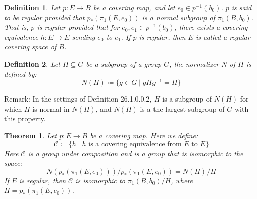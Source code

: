 \documentclass[11pt]{book}
\theoremstyle{break}
\theoremstyle{break}
\newtheorem{thm}{Theorem}[section]
\newtheorem{defn}{Definition}[corL]
\newcommand{\remark}{\color{blue}Remark: \color{black}}
\begin{document}
\begin{defn}
Let $p:E \to B$ be a covering map, and let $e_0 \in p^{-1}(b_0)$. $p$ is said to be regular provided that $p_*(\pi_1(E,e_0))$ is a normal subgroup of $\pi_1(B,b_0)$. That is, $p$ is regular provided that for $e_0, e_1 \in p^{-1}(b_0)$, there exists a covering equivalence $h:E \to E$ sending $e_0$ to $e_1$. If $p$ is regular, then $E$ is called a regular covering space of $B$.  
\end{defn}

\begin{defn}
Let $H \subseteq G$ be a subgroup of a group $G$, the normalizer $N$ of $H$ is defined by: 
$$N(H) \coloneqq \{ g\in G \mid g Hg^{-1} = H\}$$
\end{defn}
\remark In the settings of Definition 26.1.0.0.2, $H$ is a subgroup of $N(H)$ for which $H$ is normal in $N(H)$, and $N(H)$ is a the largest subgroup of $G$ with this property. 

\begin{thm}
Let $p:E \to B$ be a covering map. Here we define:
$$\mathcal{C} \coloneqq \{h \mid h\text{ is a covering equivalence from $E$ to }E\} $$ Here $\mathcal{C}$ is a group under composition and is a group that is isomorphic to the space:
$$N(p_*(\pi_1(E,e_0)))/p_*(\pi_1(E,e_0)) = N(H) / H$$ 
If $E$ is regular, then $\mathcal{C}$ is isomorphic to $\pi_1(B,b_0)/H$, where $H = p_*(\pi_1(E,e_0))$.
\end{thm}
\end{document}
